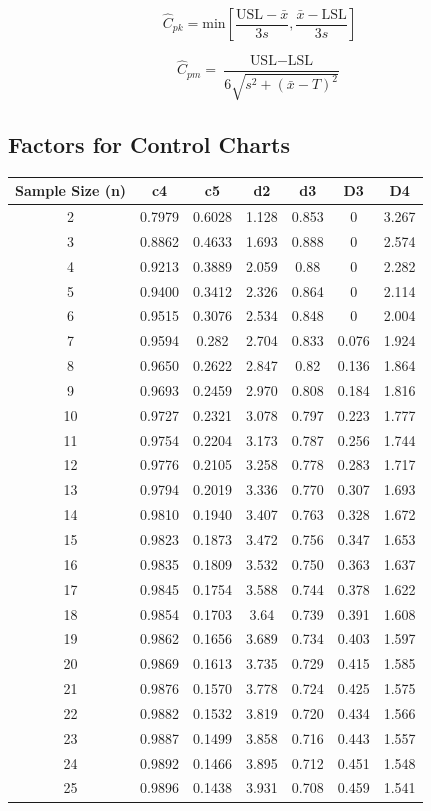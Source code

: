 \documentclass[a4paper,12pt]{article}
\begin{document}
\[ \hat{C}_{pk} = \mbox{min} \left[\frac{\mbox{USL} - \bar{x}}{3s},\frac{\bar{x} - \mbox{LSL}}{3s} \right] \]

\[ \hat{C}_{pm} = \frac{\mbox{USL} - \mbox{LSL}}{6\sqrt{s^2+(\bar{x}-T)^2}}\]
\bigskip
	\newpage
	
	\Large{
		\subsection*{Factors for Control Charts}
		\begin{tabular}{|c|c|c|c|c|c|c|}
			\hline
			Sample Size (n) 	&	c4 	&	c5 	&	d2 	&	d3 	&	D3 	&	D4	\\	\hline
			2	&	0.7979	&	0.6028	&	1.128	&	0.853	&	0	&	3.267	\\	
			3	&	0.8862	&	0.4633	&	1.693	&	0.888	&	0	&	2.574	\\	
			4	&	0.9213	&	0.3889	&	2.059	&	0.88	&	0	&	2.282	\\	
			5	&	0.9400	&	0.3412	&	2.326	&	0.864	&	0	&	2.114	\\	
			6	&	0.9515	&	0.3076	&	2.534	&	0.848	&	0	&	2.004	\\	
			7	&	0.9594	&	0.282	&	2.704	&	0.833	&	0.076	&	1.924	\\	
			8	&	0.9650	&	0.2622	&	2.847	&	0.82	&	0.136	&	1.864	\\	
			9	&	0.9693	&	0.2459	&	2.970	&	0.808	&	0.184	&	1.816	\\	
			10	&	0.9727	&	0.2321	&	3.078	&	0.797	&	0.223	&	1.777	\\	
			11	&	0.9754	&	0.2204	&	3.173	&	0.787	&	0.256	&	1.744	\\	
			12	&	0.9776	&	0.2105	&	3.258	&	0.778	&	0.283	&	1.717	\\	
			13	&	0.9794	&	0.2019	&	3.336	&	0.770	&	0.307	&	1.693	\\	
			14	&	0.9810	&	0.1940	&	3.407	&	0.763	&	0.328	&	1.672	\\	
			15	&	0.9823	&	0.1873	&	3.472	&	0.756	&	0.347	&	1.653	\\	
			16	&	0.9835	&	0.1809	&	3.532	&	0.750	&	0.363	&	1.637	\\
			17	&	0.9845	&	0.1754	&	3.588	&	0.744	&	0.378	&	1.622	\\
			18	&	0.9854	&	0.1703	&	3.64	&	0.739	&	0.391	&	1.608	\\
			19	&	0.9862	&	0.1656	&	3.689	&	0.734	&	0.403	&	1.597	\\
			20	&	0.9869	&	0.1613	&	3.735	&	0.729	&	0.415	&	1.585	\\
			21	&	0.9876	&	0.1570	&	3.778	&	0.724	&	0.425	&	1.575	\\
			22	&	0.9882	&	0.1532	&	3.819	&	0.720	&	0.434	&	1.566	\\
			23	&	0.9887	&	0.1499	&	3.858	&	0.716	&	0.443	&	1.557	\\
			24	&	0.9892	&	0.1466	&	3.895	&	0.712	&	0.451	&	1.548	\\
			25	&	0.9896	&	0.1438	&	3.931	&	0.708	&	0.459	&	1.541	\\
			\hline
		\end{tabular}
	} %
	
\end{document}
